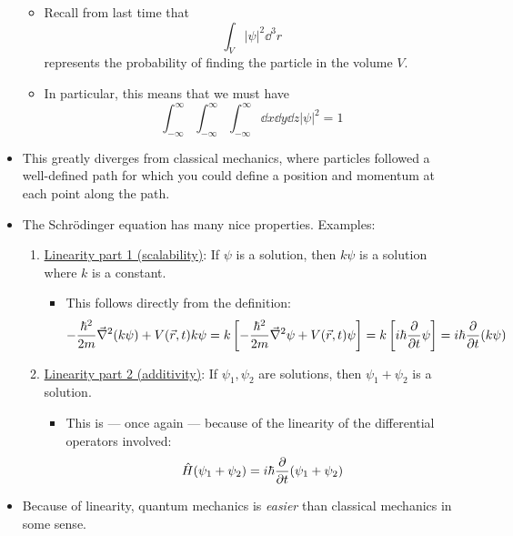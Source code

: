 \documentclass[../notes.tex]{subfiles}
\begin{document}
\begin{itemize}
\begin{itemize}
        \item Recall from last time that
        \begin{equation*}
            \int_V|\psi|^2\dd^3r
        \end{equation*}
        represents the probability of finding the particle in the volume $V$.
        \item In particular, this means that we must have
        \begin{equation*}
            \int_{-\infty}^\infty\int_{-\infty}^\infty\int_{-\infty}^\infty\dd{x}\dd{y}\dd{z}|\psi|^2 = 1
        \end{equation*}
    \end{itemize}
    \item This greatly diverges from classical mechanics, where particles followed a well-defined path for which you could define a position and momentum at each point along the path.
    \item The Schr\"{o}dinger equation has many nice properties. Examples:
    \begin{enumerate}
        \item \underline{Linearity part 1 (scalability)}: If $\psi$ is a solution, then $k\psi$ is a solution where $k$ is a constant.
        \begin{itemize}
            \item This follows directly from the definition:
            \begin{equation*}
                -\frac{\hbar^2}{2m}\vec{\nabla}^2(k\psi)+V(\vec{r},t)k\psi = k\left[ -\frac{\hbar^2}{2m}\vec{\nabla}^2\psi+V(\vec{r},t)\psi \right] = k\left[ i\hbar\pdv{t}\psi \right] = i\hbar\pdv{t}(k\psi)
            \end{equation*}
        \end{itemize}
        \item \underline{Linearity part 2 (additivity)}: If $\psi_1,\psi_2$ are solutions, then $\psi_1+\psi_2$ is a solution.
        \begin{itemize}
            \item This is --- once again --- because of the linearity of the differential operators involved:
            \begin{equation*}
                \hat{H}(\psi_1+\psi_2) = i\hbar\pdv{t}(\psi_1+\psi_2)
            \end{equation*}
        \end{itemize}
    \end{enumerate}
    \item Because of linearity, quantum mechanics is \emph{easier} than classical mechanics in some sense.

\end{itemize}
\end{document}
